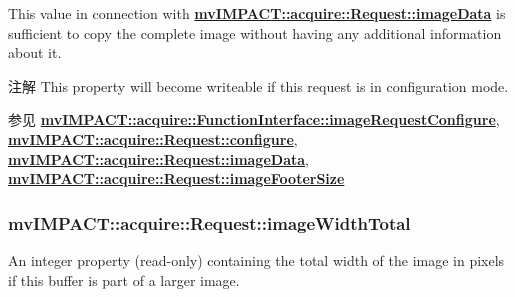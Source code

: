 This value in connection with {\bfseries \hyperlink{classmv_i_m_p_a_c_t_1_1acquire_1_1_request_ad676c45f908bb41df04b15a85bf1f6fd}{mv\+I\+M\+P\+A\+C\+T\+::acquire\+::\+Request\+::image\+Data}} is sufficient to copy the complete image without having any additional information about it.

\begin{DoxyNote}{注解}
This property will become writeable if this request is in configuration mode. 
\end{DoxyNote}
\begin{DoxySeeAlso}{参见}
{\bfseries \hyperlink{classmv_i_m_p_a_c_t_1_1acquire_1_1_function_interface_a05594ac5b54679152d27ac0e73b3908e}{mv\+I\+M\+P\+A\+C\+T\+::acquire\+::\+Function\+Interface\+::image\+Request\+Configure}}, ~\newline
{\bfseries \hyperlink{classmv_i_m_p_a_c_t_1_1acquire_1_1_request_a5ad02aed16acd60699f3d8757c63af43}{mv\+I\+M\+P\+A\+C\+T\+::acquire\+::\+Request\+::configure}}, ~\newline
{\bfseries \hyperlink{classmv_i_m_p_a_c_t_1_1acquire_1_1_request_ad676c45f908bb41df04b15a85bf1f6fd}{mv\+I\+M\+P\+A\+C\+T\+::acquire\+::\+Request\+::image\+Data}}, ~\newline
{\bfseries \hyperlink{classmv_i_m_p_a_c_t_1_1acquire_1_1_request_a6d8df3daf87f05fefbad25b7591a2459}{mv\+I\+M\+P\+A\+C\+T\+::acquire\+::\+Request\+::image\+Footer\+Size}} 
\end{DoxySeeAlso}
\hypertarget{classmv_i_m_p_a_c_t_1_1acquire_1_1_request_a7a509bd410685fe447196c821db0926e}{
\subsubsection[{image\+Width\+Total}]{ mv\+I\+M\+P\+A\+C\+T\+::acquire\+::\+Request\+::image\+Width\+Total}}\label{classmv_i_m_p_a_c_t_1_1acquire_1_1_request_a7a509bd410685fe447196c821db0926e}


An integer property {\bfseries }(read-\/only) containing the total width of the image in pixels if this buffer is part of a larger image. 

